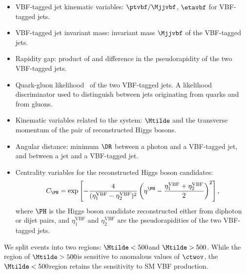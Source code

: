 \documentclass[11pt,a4paper,cmspaper,final,collab]{cms-tdr}
\begin{document}
\begin{itemize}
\item VBF-tagged jet kinematic variables: $\ptvbf/\Mjjvbf$, $\etavbf$ for VBF-tagged jets.
\item VBF-tagged jet invariant mass: invariant mass $\Mjjvbf$ of the VBF-tagged jets.
\item Rapidity gap: product of and difference in the pseudorapidity of the two VBF-tagged jets.
\item Quark-gluon likelihood~\cite{CMS:2013kfa,JetsInRun2} of the two VBF-tagged jets. A likelihood discriminator used to distinguish between jets originating from quarks and from gluons.
\item Kinematic variables related to the \HH system: $\Mtilde$ and the transverse momentum of the pair of reconstructed Higgs bosons. 
\item Angular distance: minimum $\DR$ between a photon and a VBF-tagged jet, and between a {\cPqb} jet and a VBF-tagged jet.
\item Centrality variables for the reconstructed Higgs boson candidates: 
\begin{equation}
C_{\PH} = \exp\left[-\frac{4}{(\eta^{\mathrm{VBF}}_1-\eta^{\mathrm{VBF}}_2)^2}\left(\eta^{\PH}-\frac{\eta^{\mathrm{VBF}}_{1}+\eta^{\mathrm{VBF}}_{2}}{2} \right)^2  \right],
\end{equation}
where $\PH$ is the Higgs boson candidate reconstructed either from diphoton or dijet pairs, and $\eta^{\mathrm{VBF}}_{1}$ and $\eta^{\mathrm{VBF}}_{2}$ are the pseudorapidities of the two VBF-tagged jets.

\end{itemize}

We split events into two regions: $\Mtilde<500$\GeV and $\Mtilde>500$\GeV. While the region of $\Mtilde>500$\GeV is sensitive to anomalous values of $\ctwov$, the $\Mtilde<500$\GeV region retains the sensitivity to SM VBF \HH production.
\end{document}

